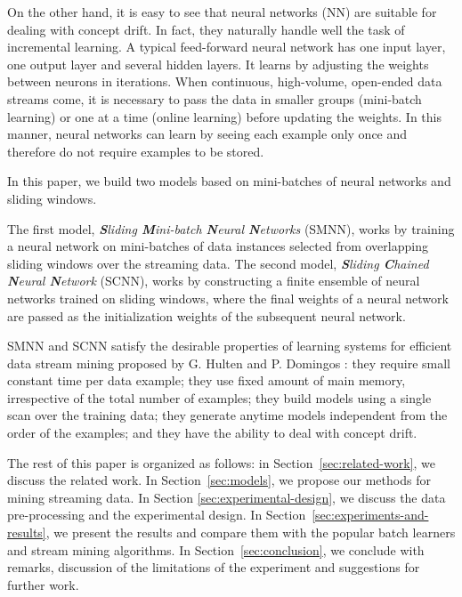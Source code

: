 \documentclass[conference]{IEEEtran}
\begin{document}
		On the other hand, it is easy to see that neural networks (NN) are suitable for dealing with concept drift. In fact, they naturally handle well the task of incremental learning. A typical feed-forward neural network has one input layer, one output layer and several hidden layers. It learns by adjusting the weights between neurons in iterations. When continuous, high-volume, open-ended data streams come, it is necessary to pass the data in smaller groups (mini-batch learning) or one at a time (online learning) before updating the weights. In this manner, neural networks can learn by seeing each example only once and therefore do not require examples to be stored. 
		
		In this paper, we build two models based on mini-batches of neural networks and sliding windows.

		The first model, \emph{\textbf{S}liding \textbf{M}ini-batch  \textbf{N}eural \textbf{N}etworks} (SMNN), works by training a neural network on mini-batches of data instances selected from overlapping sliding windows over the streaming data. The second model, \emph{\textbf{S}liding \textbf{C}hained  \textbf{N}eural \textbf{N}etwork} (SCNN), works by constructing a finite ensemble of neural networks trained on sliding windows, where the final weights of a neural network are passed as the initialization weights of the subsequent neural network.		
		
		SMNN and SCNN satisfy the desirable properties of learning systems for efficient data stream mining proposed by G. Hulten and P. Domingos \cite{Domingos}: they require small constant time per data example; they use fixed amount of main memory, irrespective of the total number of examples; they build models using a single scan over the training data; they generate anytime models independent from the order of the examples; and they have the ability to deal with concept drift. 
		
		The rest of this paper is organized as follows: in Section~\ref{sec:related-work}, we discuss the related work. In Section~\ref{sec:models}, we propose our methods for mining streaming data. In Section \ref{sec:experimental-design}, we discuss the data pre-processing and the experimental design. In Section~\ref{sec:experiments-and-results}, we present the results and compare them with the popular batch learners and stream mining algorithms. In Section~\ref{sec:conclusion}, we conclude with remarks, discussion of the limitations of the experiment and suggestions for further work.
		
\end{document}
